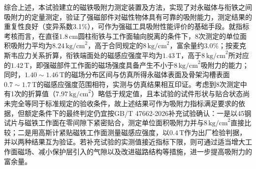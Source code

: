 综合上述，本试验建立的磁铁吸附力测定装置及方法，实现了对永磁体与衔铁之间吸附力的定量测定，验证了强磁部件对磁性物体具有可靠的吸附能力，测定结果的重复性良好（变异系数3.1\%），可作为强磁工具吸附性能评价的基础手段。就指标考核而言，在直径$1.8\,\text{cm}$圆柱衔铁与工作面轴向脱离的条件下，8次测定的单位面积吸附力平均为$8.24\,\text{kg/cm}^2$，高于合同规定的$8\,\text{kg/cm}^2$，富余量约$3.0\%$；按麦克斯韦应力关系折算，衔铁端面处的磁感应强度平均为$1.43\,\text{T}$，高于$8\,\text{kg/cm}^2$所对应的$1.42\,\text{T}$，即强磁部件工作面的磁场强度具备产生不小于$8\,\text{kg/cm}^2$吸附力的能力；同时，$1.40\sim 1.46\,\text{T}$的磁场分布区间与仿真所得永磁体表面及骨架沟槽表面$0.7\sim 1.7\,\text{T}$的磁感应强度范围相符，实测与仿真结果相互印证。考虑到8次测定中有1次的折算值（$7.97\,\text{kg/cm}^2$）略低于规定值，且本试验的试件形状与贴合状态尚未完全等同于标准规定的验收条件，故上述结果可作为吸附力指标满足要求的依据，但额定条件下的最终判定仍宜按GB/T 47662-2026补充试验确认：一是以45钢试片与磁铁工作面在零间隙下紧密贴合，测定单位面积吸附力并与$8\,\text{kg/cm}^2$直接比较；二是用高斯计紧贴磁铁工作面测量磁感应强度，以$0.4\,\text{T}$作为出厂检验判据，并以两种结果互为验证。若补充试验的实测值接近指标下限，则可通过适当增大工作面磁场、减小保护层引入的气隙以及改进磁路结构等措施，进一步提高吸附力的富余量。
